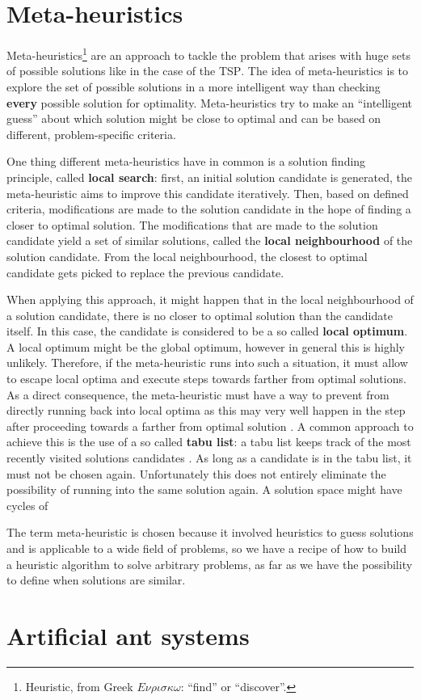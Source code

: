 \section{Meta-heuristics}
Meta-heuristics\footnote{Heuristic, from Greek $E\nu\rho\iota\sigma\kappa\omega$: \enquote{find} or \enquote{discover}.} are an approach to tackle the problem that arises with huge sets of possible solutions like in the case of the \textsc{TSP}. The idea of meta-heuristics is to explore the set of possible solutions in a more intelligent way than checking \textbf{every} possible solution for optimality. Meta-heuristics try to make an \enquote{intelligent guess} about which solution might be close to optimal and can be based on different, problem-specific criteria.

One thing different meta-heuristics have in common is a solution finding principle, called \textbf{local search}: first, an initial solution candidate is generated, the meta-heuristic aims to improve this candidate iteratively. Then, based on defined criteria, modifications are made to the solution candidate in the hope of finding a closer to optimal solution. The modifications that are made to the solution candidate yield a set of similar solutions, called the \textbf{local neighbourhood} of the solution candidate. From the local neighbourhood, the closest to optimal candidate gets picked to replace the previous candidate.

When applying this approach, it might happen that in the local neighbourhood of a solution candidate, there is no closer to optimal solution than the candidate itself. In this case, the candidate is considered to be a so called \textbf{local optimum}. A local optimum might be the global optimum, however in general this is highly unlikely. Therefore, if the meta-heuristic runs into such a situation, it must allow to escape local optima and execute steps towards farther from optimal solutions. As a direct consequence, the meta-heuristic must have a way to prevent from directly running back into local optima as this may very well happen in the step after proceeding towards a farther from optimal solution \cite{}. A common approach to achieve this is the use of a so called \textbf{tabu list}: a tabu list keeps track of the most recently visited solutions candidates \cite{}. As long as a candidate is in the tabu list, it must not be chosen again. Unfortunately this does not entirely eliminate the possibility of running into the same solution again. A solution space might have cycles of 

The term meta-heuristic is chosen because it involved heuristics to guess solutions and is applicable to a wide field of problems, so we have a recipe of how to build a heuristic algorithm to solve arbitrary problems, as far as we have the possibility to define when solutions are similar.

\section{Artificial ant systems}
